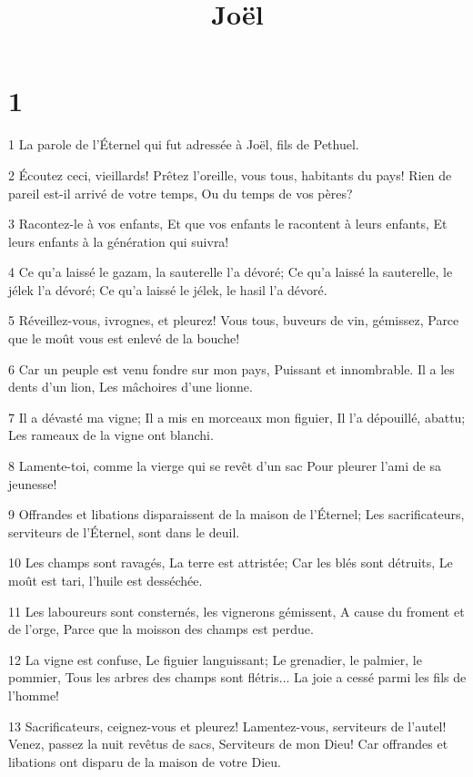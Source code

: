 

\title{Joël}


\chapter{1}

\par 1 La parole de l'Éternel qui fut adressée à Joël, fils de Pethuel.
\par 2 Écoutez ceci, vieillards! Prêtez l'oreille, vous tous, habitants du pays! Rien de pareil est-il arrivé de votre temps, Ou du temps de vos pères?
\par 3 Racontez-le à vos enfants, Et que vos enfants le racontent à leurs enfants, Et leurs enfants à la génération qui suivra!
\par 4 Ce qu'a laissé le gazam, la sauterelle l'a dévoré; Ce qu'a laissé la sauterelle, le jélek l'a dévoré; Ce qu'a laissé le jélek, le hasil l'a dévoré.
\par 5 Réveillez-vous, ivrognes, et pleurez! Vous tous, buveurs de vin, gémissez, Parce que le moût vous est enlevé de la bouche!
\par 6 Car un peuple est venu fondre sur mon pays, Puissant et innombrable. Il a les dents d'un lion, Les mâchoires d'une lionne.
\par 7 Il a dévasté ma vigne; Il a mis en morceaux mon figuier, Il l'a dépouillé, abattu; Les rameaux de la vigne ont blanchi.
\par 8 Lamente-toi, comme la vierge qui se revêt d'un sac Pour pleurer l'ami de sa jeunesse!
\par 9 Offrandes et libations disparaissent de la maison de l'Éternel; Les sacrificateurs, serviteurs de l'Éternel, sont dans le deuil.
\par 10 Les champs sont ravagés, La terre est attristée; Car les blés sont détruits, Le moût est tari, l'huile est desséchée.
\par 11 Les laboureurs sont consternés, les vignerons gémissent, A cause du froment et de l'orge, Parce que la moisson des champs est perdue.
\par 12 La vigne est confuse, Le figuier languissant; Le grenadier, le palmier, le pommier, Tous les arbres des champs sont flétris... La joie a cessé parmi les fils de l'homme!
\par 13 Sacrificateurs, ceignez-vous et pleurez! Lamentez-vous, serviteurs de l'autel! Venez, passez la nuit revêtus de sacs, Serviteurs de mon Dieu! Car offrandes et libations ont disparu de la maison de votre Dieu.
